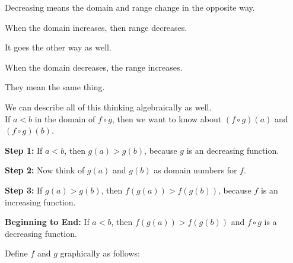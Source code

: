 \documentclass{ximera}
\begin{document}
\begin{warning}

Decreasing means the domain and range change in the opposite way.

When the domain increases, then range decreases.

It goes the other way as well.

When the domain decreases, the range increases.

They mean the same thing.


\end{warning}






We can describe all of this thinking algebraically as well. \\


If $a < b$ in the domain of $f \circ g$, then we want to know about $(f \circ g)(a)$  and $(f \circ g)(b)$.



\textbf{Step 1:}  If $a < b$, then $g(a) > g(b)$, because $g$ is an decreasing function.


\textbf{Step 2:}  Now think of $g(a)$  and $g(b)$ as domain numbers for $f$.


\textbf{Step 3:}  If $g(a) > g(b)$, then $f(g(a)) > f(g(b))$, because $f$ is an increasing function.


\textbf{Beginning to End:} If $a < b$, then $f(g(a)) > f(g(b))$ and $f \circ g$ is a decreasing function.
















































Define $f$ and $g$ graphically as follows:
\end{document}
